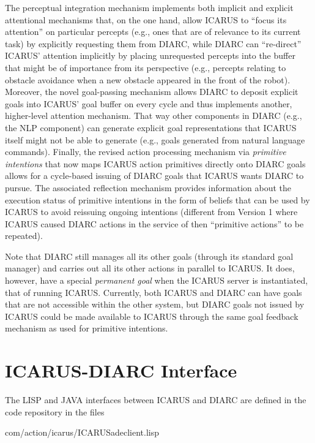 \documentclass{article}
\begin{document}
The perceptual integration mechanism implements both implicit and
explicit attentional mechanisms that, on the one hand, allow ICARUS to
``focus its attention'' on particular percepts (e.g., ones that are of
relevance to its current task) by explicitly requesting them from
DIARC, while DIARC can ``re-direct'' ICARUS' attention implicitly by
placing unrequested percepts into the buffer that might be of
importance from its perspective (e.g., percepts relating to obstacle
avoidance when a new obstacle appeared in the front of the robot).
Moreover, the novel goal-passing mechanism allows DIARC to deposit
explicit goals into ICARUS' goal buffer on every cycle and thus
implements another, higher-level attention mechanism.  That way other
components in DIARC (e.g., the NLP component) can generate explicit
goal representations that ICARUS itself might not be able to generate
(e.g., goals generated from natural language commands).  Finally, the
revised action processing mechanism via {\em primitive intentions}
that now maps ICARUS action primitives directly onto DIARC goals
allows for a cycle-based issuing of DIARC goals that ICARUS wants
DIARC to pursue.  The associated reflection mechanism provides
information about the execution status of primitive intentions in the
form of beliefs that can be used by ICARUS to avoid reissuing ongoing
intentions (different from Version 1 where ICARUS caused DIARC actions
in the service of then ``primitive actions'' to be repeated).

Note that DIARC still manages all its other goals (through its
standard goal manager) and carries out all its other actions in
parallel to ICARUS.  It does, however, have a special {\em permanent
  goal} when the ICARUS server is instantiated, that of running
ICARUS.  Currently, both ICARUS and DIARC can have goals that are not
accessible within the other system, but DIARC goals not issued by
ICARUS could be made available to ICARUS through the same goal
feedback mechanism as used for primitive intentions.


\section*{ICARUS-DIARC Interface}

The LISP and JAVA interfaces between ICARUS and DIARC are defined in
the code repository in the files

\vspace{2mm}
\centerline{com/action/icarus/ICARUSadeclient.lisp}
\vspace{2mm}
\end{document}
